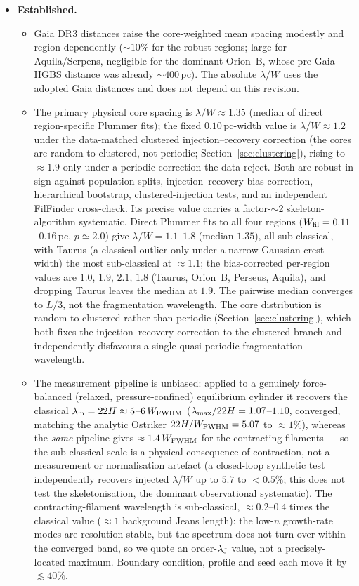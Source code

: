 \documentclass[usenatbib,twoside,twocolumn]{mnras}
\begin{document}
\begin{itemize}
    \item \textbf{Established.}
    \begin{itemize}
        \item Gaia DR3 distances raise the core-weighted mean spacing modestly and region-dependently ($\sim10\%$ for the robust regions; large for Aquila/Serpens, negligible for the dominant Orion~B, whose pre-Gaia HGBS distance was already $\sim400$\,pc). The absolute $\lambda/W$ uses the adopted Gaia distances and does not depend on this revision.
        \item The primary physical core spacing is $\lambda/W\approx1.35$ (median of direct region-specific Plummer fits); the fixed $0.10$\,pc-width value is $\lambda/W\approx1.2$ under the data-matched clustered injection--recovery correction (the cores are random-to-clustered, not periodic; Section~\ref{sec:clustering}), rising to $\approx1.9$ only under a periodic correction the data reject. Both are robust in sign against population splits, injection--recovery bias correction, hierarchical bootstrap, clustered-injection tests, and an independent FilFinder cross-check. Its precise value carries a factor-$\sim$2 skeleton-algorithm systematic. Direct Plummer fits to all four regions ($W_{\rm fil}=0.11$--$0.16$\,pc, $p\simeq2.0$) give $\lambda/W=1.1$--$1.8$ (median $1.35$), all sub-classical, with Taurus (a classical outlier only under a narrow Gaussian-crest width) the most sub-classical at $\approx1.1$; the bias-corrected per-region values are $1.0$, $1.9$, $2.1$, $1.8$ (Taurus, Orion~B, Perseus, Aquila), and dropping Taurus leaves the median at $1.9$. The pairwise median converges to $L/3$, not the fragmentation wavelength. The core distribution is random-to-clustered rather than periodic (Section~\ref{sec:clustering}), which both fixes the injection--recovery correction to the clustered branch and independently disfavours a single quasi-periodic fragmentation wavelength.
        \item The measurement pipeline is unbiased: applied to a genuinely force-balanced (relaxed, pressure-confined) equilibrium cylinder it recovers the classical $\lambda_{\rm m}=22H\approx5$--$6\,W_{\rm FWHM}$ ($\lambda_{\rm max}/22H=1.07$--$1.10$, converged, matching the analytic Ostriker $22H/W_{\rm FWHM}=5.07$ to $\approx1\%$), whereas the \emph{same} pipeline gives $\approx1.4\,W_{\rm FWHM}$ for the contracting filaments --- so the sub-classical scale is a physical consequence of contraction, not a measurement or normalisation artefact (a closed-loop synthetic test independently recovers injected $\lambda/W$ up to $5.7$ to $<0.5\%$; this does not test the skeletonisation, the dominant observational systematic). The contracting-filament wavelength is sub-classical, $\approx0.2$--$0.4$ times the classical value ($\approx1$ background Jeans length): the low-$n$ growth-rate modes are resolution-stable, but the spectrum does not turn over within the converged band, so we quote an order-$\lambda_{\rm J}$ value, not a precisely-located maximum. Boundary condition, profile and seed each move it by $\lesssim40\%$.

\end{itemize}
\end{itemize}
\end{document}
